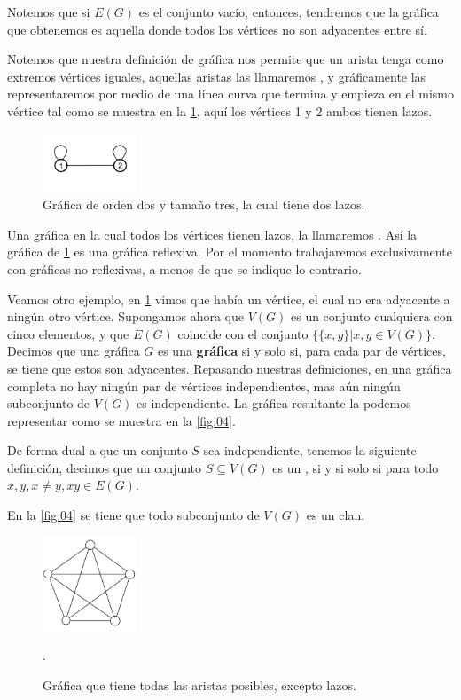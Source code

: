 Notemos que si $E(G)$ es el conjunto vacío, entonces, tendremos que la gráfica
que obtenemos es aquella donde todos los vértices no son adyacentes entre sí.

Notemos que nuestra definición de gráfica nos permite que un arista tenga como
extremos vértices iguales, aquellas aristas las llamaremos , y
gráficamente las representaremos por medio de una linea curva que termina y
empieza en el mismo vértice tal como se muestra en la \cref{fig:02}, aquí los
vértices 1 y 2 ambos tienen lazos.

\begin{figure}[H]
  \centering
  \includegraphics[width=0.25\textwidth]{recursos/capturas/02.jpg}
  \caption{Gráfica de orden dos y tamaño tres, la cual tiene dos lazos.}
  \label{fig:02}
\end{figure}

Una gráfica en la cual todos los vértices tienen lazos, la llamaremos
. Así la gráfica de \cref{fig:02} es una gráfica
reflexiva. Por el momento trabajaremos exclusivamente con gráficas no
reflexivas, a menos de que se indique lo contrario.

Veamos otro ejemplo, en \cref{fig:02} vimos que había un vértice, el cual no era
adyacente a ningún otro vértice. Supongamos ahora que $V(G)$ es un conjunto
cualquiera con cinco elementos, y que $E(G)$ coincide con el conjunto $\{
\{x,y\} | x,y\in V(G) \}$. Decimos que una gráfica $G$ es una
\textbf{gráfica} si y solo si, para cada par de
vértices, se tiene que estos son adyacentes. Repasando nuestras definiciones, en
una gráfica completa no hay ningún par de vértices independientes, mas aún
ningún subconjunto de $V(G)$ es independiente. La gráfica resultante la podemos
representar como se muestra en la \cref{fig:04}.

De forma dual a que un conjunto $S$ sea independiente, tenemos la siguiente
definición, decimos que un conjunto $S\subseteq V(G)$ es un , si y
si solo si para todo $x,y, x\neq y, xy\in E(G)$.   

En la \cref{fig:04} se tiene que todo subconjunto de $V(G)$ es un clan.

\begin{figure}[H]
  \centering
  \includegraphics[width=0.25\textwidth]{recursos/capturas/04.jpg}
  \caption{Gráfica que tiene todas las aristas posibles, excepto lazos.}.
  \label{fig:03}
\end{figure}

